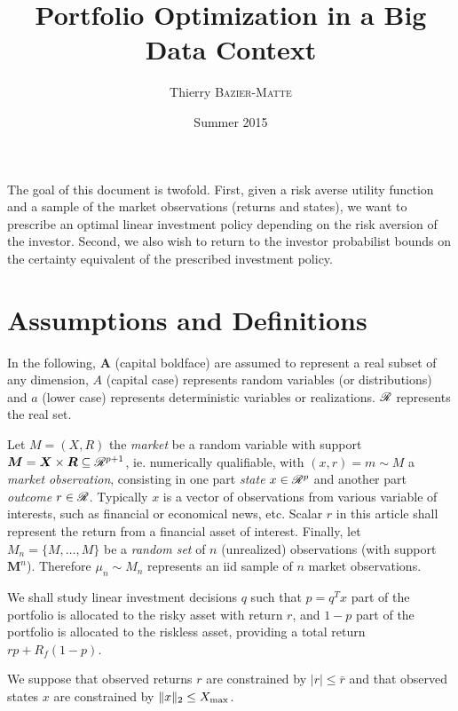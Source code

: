 \documentclass[11pt]{article}
\title{Portfolio Optimization in a Big Data Context}
\author{Thierry \textsc{Bazier-Matte}}
\date{Summer 2015}
\begin{document}
\maketitle


The goal of this document is twofold. First, given a risk averse utility function and a
sample of the market observations (returns and states), we want to prescribe an optimal
linear investment policy depending on the risk aversion of the investor. Second, we also
wish to return to the investor probabilist bounds on the certainty equivalent of the
prescribed investment policy.

\section{Assumptions and Definitions}

In the following, $\bm A$ (capital boldface) are assumed to represent a real subset of any
dimension, $A$ (capital case) represents random variables (or distributions) and $a$
(lower case) represents deterministic variables or realizations. $\mathscr{R}$ represents the
real set.

Let $M=(X,R)$ the \textsl{market} be a random variable with support
$\bm M = \bm X\times \bm R \subseteq\mathscr{R}^{p+1}$, ie. numerically qualifiable, with
$(x,r) = m\sim M$ a \textsl{market observation}, consisting in one part \textsl{state}
$x\in\mathscr{R}^p$ and another part \textsl{outcome} $r\in\mathscr{R}$. Typically $x$ is a vector of
observations from various variable of interests, such as financial or economical news,
etc. Scalar $r$ in this article shall represent the return from a financial asset of
interest. Finally, let $M_n = \{M,\dots,M\}$ be a \textsl{random set} of $n$ (unrealized)
observations (with support $\bm M^n$). Therefore $\mu_n \sim M_n$ represents an iid sample
of $n$ market observations.

We shall study linear investment decisions $q$ such that $p=q^Tx$ part of the portfolio is
allocated to the risky asset with return $r$, and $1-p$ part of the portfolio is allocated
to the riskless asset, providing a total return $rp + R_f(1-p)$.
\begin{assumption}
  We suppose that observed returns $r$ are constrained by $|r| \leq \bar r$ and that
  observed states $x$ are constrained by $\|x\|_2 \leq X_{\max}$.
\end{assumption}
\end{document}
